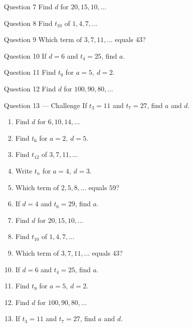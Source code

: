 \documentclass[11pt]{article}
\begin{document}
\begin{qbox}{Question 7}
Find $d$ for $20,15,10,\dots$\workspace{2.4cm}
\end{qbox}

\begin{qbox}{Question 8}
Find $t_{10}$ of $1,4,7,\dots$\workspace{2.4cm}
\end{qbox}

\begin{qbox}{Question 9}
Which term of $3,7,11,\dots$ equals $43$?\workspace{2.4cm}
\end{qbox}

\begin{qbox}{Question 10}
If $d=6$ and $t_4=25$, find $a$.\workspace{2.4cm}
\end{qbox}

\begin{qbox}{Question 11}
Find $t_9$ for $a=5,\ d=2$.\workspace{2.4cm}
\end{qbox}

\begin{qbox}{Question 12}
Find $d$ for $100,90,80,\dots$\workspace{2.4cm}
\end{qbox}

\begin{qbox}{Question 13 --- Challenge}
If $t_3=11$ and $t_7=27$, find $a$ and $d$.\workspace{3cm}
\end{qbox}

\clearpage
{}

\begin{recapbox}
\begin{multicols}{2}
\small
\begin{enumerate}[leftmargin=*,itemsep=3pt]
  \item Find $d$ for $6,10,14,\dots$
  \item Find $t_6$ for $a=2,\ d=5$.
  \item Find $t_{12}$ of $3,7,11,\dots$
  \item Write $t_n$ for $a=4,\ d=3$.
  \item Which term of $2,5,8,\dots$ equals $59$?
  \item If $d=4$ and $t_6=29$, find $a$.
  \item Find $d$ for $20,15,10,\dots$
  \item Find $t_{10}$ of $1,4,7,\dots$
  \item Which term of $3,7,11,\dots$ equals $43$?
  \item If $d=6$ and $t_4=25$, find $a$.
  \item Find $t_9$ for $a=5,\ d=2$.
  \item Find $d$ for $100,90,80,\dots$
  \item If $t_3=11$ and $t_7=27$, find $a$ and $d$.
\end{enumerate}
\end{multicols}
\end{recapbox}
\end{document}
